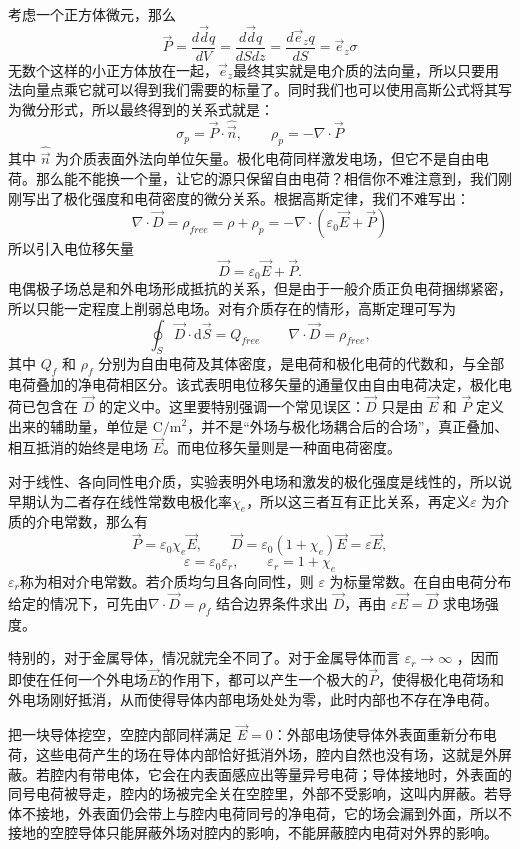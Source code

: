 \documentclass[UTF8]{ctexbook}
\begin{document}
考虑一个正方体微元，那么
\[
\vec{P}=\frac{d\vec{d}q}{dV}=\frac{d\vec{d}q}{dSdz}=\frac{d\vec{e}_z q}{dS}=\vec{e}_z
\sigma
\]
无数个这样的小正方体放在一起，$\vec{e}_z$最终其实就是电介质的法向量，所以只要用法向量点乘它就可以得到我们需要的标量了。同时我们也可以使用高斯公式将其写为微分形式，所以最终得到的关系式就是：
\[
\sigma_p=\vec{P}\cdot\hat{\vec{n}},  \qquad \rho_p=-\nabla\cdot\vec{P}
\]
其中 \(\hat{\vec{n}}\) 为介质表面外法向单位矢量。极化电荷同样激发电场，但它不是自由电荷。那么能不能换一个量，让它的源只保留自由电荷？相信你不难注意到，我们刚刚写出了极化强度和电荷密度的微分关系。根据高斯定律，我们不难写出：
\[
\nabla \cdot  \vec{D}=\rho_{free}=\rho+ \rho_{p}=-\nabla \cdot(\varepsilon_0 \vec{E}+\vec{P})
\]
所以引入电位移矢量
\[
    \vec{D}=\varepsilon_0\vec{E}+\vec{P}.
\]
电偶极子场总是和外电场形成抵抗的关系，但是由于一般介质正负电荷捆绑紧密，所以只能一定程度上削弱总电场。对有介质存在的情形，高斯定理可写为
\[
    \oint_S \vec{D}\cdot\mathrm{d}\vec{S}=Q_{free}
    \qquad
    \nabla\cdot\vec{D}=\rho_{free},
\]
其中 \(Q_{f}\) 和 \(\rho_f\) 分别为自由电荷及其体密度，是电荷和极化电荷的代数和，与全部电荷叠加的净电荷相区分。该式表明电位移矢量的通量仅由自由电荷决定，极化电荷已包含在 \(\vec{D}\) 的定义中。这里要特别强调一个常见误区：$\vec{D}$ 只是由 $\vec{E}$ 和 $\vec{P}$ 定义出来的辅助量，单位是 $\mathrm{C/m^2}$，并不是“外场与极化场耦合后的合场”，真正叠加、相互抵消的始终是电场 $\vec{E}$。而电位移矢量则是一种面电荷密度。

对于线性、各向同性电介质，实验表明外电场和激发的极化强度是线性的，所以说早期认为二者存在线性常数电极化率$\chi_e$，所以这三者互有正比关系，再定义\(\varepsilon\) 为介质的介电常数，那么有
\[
    \vec{P}=\varepsilon_0\chi_e\vec{E},
\qquad
    \vec{D}=\varepsilon_0(1+\chi_e)\vec{E}
    =\varepsilon\vec{E},
\]
\[
    \varepsilon=\varepsilon_0\varepsilon_r,
    \qquad
    \varepsilon_r=1+\chi_e
\]
$ \varepsilon_r$称为相对介电常数。若介质均匀且各向同性，则 \(\varepsilon\) 为标量常数。在自由电荷分布给定的情况下，可先由$\nabla\cdot\vec{D}=\rho_f$
结合边界条件求出 \(\vec{D}\)，再由 \(\varepsilon \vec{E}=\vec{D}\) 求电场强度。

特别的，对于金属导体，情况就完全不同了。对于金属导体而言 $\varepsilon_r\to\infty$ ，因而即使在任何一个外电场$\vec{E}$的作用下，都可以产生一个极大的$\vec{P}$，使得极化电荷场和外电场刚好抵消，从而使得导体内部电场处处为零，此时内部也不存在净电荷。

把一块导体挖空，空腔内部同样满足 $\vec{E}=0$：外部电场使导体外表面重新分布电荷，这些电荷产生的场在导体内部恰好抵消外场，腔内自然也没有场，这就是外屏蔽。若腔内有带电体，它会在内表面感应出等量异号电荷；导体接地时，外表面的同号电荷被导走，腔内的场被完全关在空腔里，外部不受影响，这叫内屏蔽。若导体不接地，外表面仍会带上与腔内电荷同号的净电荷，它的场会漏到外面，所以不接地的空腔导体只能屏蔽外场对腔内的影响，不能屏蔽腔内电荷对外界的影响。
\end{document}
